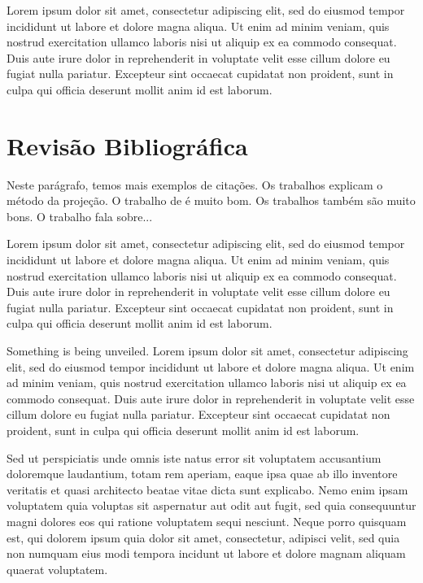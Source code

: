 Lorem ipsum dolor sit amet, consectetur adipiscing elit, sed do eiusmod tempor incididunt ut labore et dolore magna aliqua. Ut enim ad minim veniam, quis nostrud exercitation ullamco laboris nisi ut aliquip ex ea commodo consequat. Duis aute irure dolor in reprehenderit in voluptate velit esse cillum dolore eu fugiat nulla pariatur. Excepteur sint occaecat cupidatat non proident, sunt in culpa qui officia deserunt mollit anim id est laborum.




\section*{Revisão Bibliográfica}



Neste parágrafo, temos mais exemplos de citações. Os trabalhos \cite{Guermond:2006,Guermond:2003} explicam o método da projeção. O trabalho de  é muito bom. Os trabalhos \cite{Munz:2003,Thomadakis:1996} também são muito bons. O trabalho \cite{cotta:1996} fala sobre...

Lorem ipsum dolor sit amet, consectetur adipiscing elit, sed do eiusmod tempor incididunt ut labore et dolore magna aliqua. Ut enim ad minim veniam, quis nostrud exercitation ullamco laboris nisi ut aliquip ex ea commodo consequat. Duis aute irure dolor in reprehenderit in voluptate velit esse cillum dolore eu fugiat nulla pariatur. Excepteur sint occaecat cupidatat non proident, sunt in culpa qui officia deserunt mollit anim id est laborum.

Something is being unveiled. Lorem ipsum dolor sit amet, consectetur adipiscing elit, sed do eiusmod tempor incididunt ut labore et dolore magna aliqua. Ut enim ad minim veniam, quis nostrud exercitation ullamco laboris nisi ut aliquip ex ea commodo consequat. Duis aute irure dolor in reprehenderit in voluptate velit esse cillum dolore eu fugiat nulla pariatur. Excepteur sint occaecat cupidatat non proident, sunt in culpa qui officia deserunt mollit anim id est laborum.

Sed ut perspiciatis unde omnis iste natus error sit voluptatem accusantium doloremque laudantium, totam rem aperiam, eaque ipsa quae ab illo inventore veritatis et quasi architecto beatae vitae dicta sunt explicabo. Nemo enim ipsam voluptatem quia voluptas sit aspernatur aut odit aut fugit, sed quia consequuntur magni dolores eos qui ratione voluptatem sequi nesciunt. Neque porro quisquam est, qui dolorem ipsum quia dolor sit amet, consectetur, adipisci velit, sed quia non numquam eius modi tempora incidunt ut labore et dolore magnam aliquam quaerat voluptatem.



